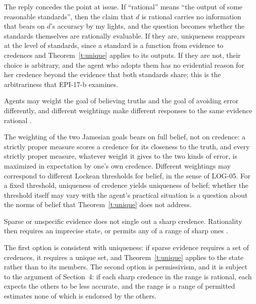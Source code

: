 \documentclass{situationist-preprint}
\begin{document}
\begin{reply}
The reply concedes the point at issue. If \enquote{rational} means \enquote{the output of some reasonable standards}, then the claim that $d$ is rational carries no information that bears on $d$'s accuracy by my lights, and the question becomes whether the standards themselves are rationally evaluable. If they are, uniqueness reappears at the level of standards, since a standard is a function from evidence to credences and Theorem~\ref{t:unique} applies to its outputs. If they are not, their choice is arbitrary, and the agent who adopts them has no evidential reason for her credence beyond the evidence that both standards share; this is the arbitrariness that EPI-17-b examines.
\end{reply}

\begin{objection}
Agents may weight the goal of believing truths and the goal of avoiding error differently, and different weightings make different responses to the same evidence rational \citep{Kelly2014}.
\end{objection}

\begin{reply}
The weighting of the two Jamesian goals bears on full belief, not on credence: a strictly proper measure scores a credence for its closeness to the truth, and every strictly proper measure, whatever weight it gives to the two kinds of error, is maximized in expectation by one's own credence. Different weightings may correspond to different Lockean thresholds for belief, in the sense of LOG-05. For a fixed threshold, uniqueness of credence yields uniqueness of belief; whether the threshold itself may vary with the agent's practical situation is a question about the norms of belief that Theorem~\ref{t:unique} does not address.
\end{reply}

\begin{objection}
Sparse or unspecific evidence does not single out a sharp credence. Rationality then requires an imprecise state, or permits any of a range of sharp ones \citep{Joyce2005}.
\end{objection}

\begin{reply}
The first option is consistent with uniqueness: if sparse evidence requires a set of credences, it requires a unique set, and Theorem~\ref{t:unique} applies to the state rather than to its members. The second option is permissivism, and it is subject to the argument of Section~4: if each sharp credence in the range is rational, each expects the others to be less accurate, and the range is a range of permitted estimates none of which is endorsed by the others.
\end{reply}
\end{document}
